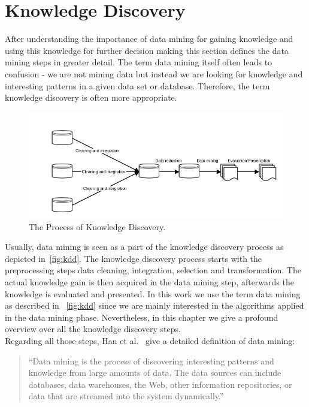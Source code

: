 \section{Knowledge Discovery}

After understanding the importance of data mining for gaining knowledge and using this knowledge for further decision making this section defines the data mining steps in greater detail. The term data mining itself often leads to confusion - we are not mining data but instead we are looking for knowledge and interesting patterns in a given data set or database. Therefore, the term knowledge discovery is often more appropriate.


\begin{figure}[htsb]
  \centering
  \includegraphics[scale=0.5]{figures/kdd}
  \caption[The Process of Knowledge Discovery]{The Process of Knowledge Discovery.}\label{fig:kdd}
\end{figure}

Usually, data mining is seen as a part of the knowledge discovery process as depicted in~\autoref{fig:kdd}. The knowledge discovery process starts with the preprocessing steps data cleaning, integration, selection and transformation. The actual knowledge gain is then acquired in the data mining step, afterwards the knowledge is evaluated and presented. In this work we use the term data mining as described in ~\autoref{fig:kdd} since we are mainly interested in the algorithms applied in the data mining phase. Nevertheless, in this chapter we give a profound overview over all the knowledge discovery steps.
\\
Regarding all those steps, Han et al.~\parencite{dmbook} give a detailed definition of data mining: 
\begin{quote}
“Data mining is the process of discovering interesting patterns and knowledge from large amounts of data. The data sources can include databases, data warehouses, the Web, other information repositories, or data that are streamed into the system dynamically.”
\end{quote}

